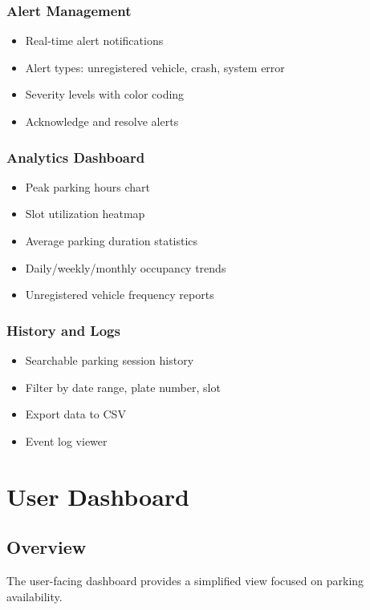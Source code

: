 \documentclass[12pt,a4paper]{report}
\begin{document}
\subsubsection{Alert Management}
\begin{itemize}
    \item Real-time alert notifications
    \item Alert types: unregistered vehicle, crash, system error
    \item Severity levels with color coding
    \item Acknowledge and resolve alerts
\end{itemize}

\subsubsection{Analytics Dashboard}
\begin{itemize}
    \item Peak parking hours chart
    \item Slot utilization heatmap
    \item Average parking duration statistics
    \item Daily/weekly/monthly occupancy trends
    \item Unregistered vehicle frequency reports
\end{itemize}

\subsubsection{History and Logs}
\begin{itemize}
    \item Searchable parking session history
    \item Filter by date range, plate number, slot
    \item Export data to CSV
    \item Event log viewer
\end{itemize}


\section{User Dashboard}

\subsection{Overview}
The user-facing dashboard provides a simplified view focused on parking availability.
\end{document}
